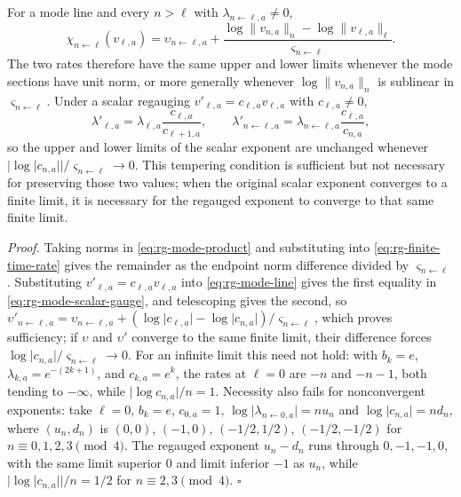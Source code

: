 For a mode line and every \(n>\ell\) with \(\lambda_{n\leftarrow\ell,a}\neq0\),
\begin{equation}
\chi_{n\leftarrow\ell}(v_{\ell,a})
=\upsilon_{n\leftarrow\ell,a}
+\frac{\log\lVert v_{n,a}\rVert_n-\log\lVert v_{\ell,a}\rVert_\ell}
{\varsigma_{n\leftarrow\ell}}.
\label{eq:rg-mode-exponent-relation}
\end{equation}
The two rates therefore have the same upper and lower limits whenever the mode
sections have unit norm, or more generally whenever
\(\log\lVert v_{n,a}\rVert_n\) is sublinear in \(\varsigma_{n\leftarrow\ell}\).
Under a scalar regauging \(v'_{\ell,a}=c_{\ell,a}v_{\ell,a}\) with
\(c_{\ell,a}\neq0\),
\begin{equation}
\lambda'_{\ell,a}=\lambda_{\ell,a}\frac{c_{\ell,a}}{c_{\ell+1,a}},
\qquad
\lambda'_{n\leftarrow\ell,a}
=\lambda_{n\leftarrow\ell,a}\frac{c_{\ell,a}}{c_{n,a}},
\label{eq:rg-mode-scalar-gauge}
\end{equation}
so the upper and lower limits of the scalar exponent are unchanged whenever
\(\lvert\log\lvert c_{n,a}\rvert\rvert/\varsigma_{n\leftarrow\ell}\to0\). This
tempering condition is sufficient but not necessary for preserving those two
values; when the original scalar exponent converges to a finite limit, it is necessary
for the regauged exponent to converge to that same finite limit. 

\noindent\emph{Proof.}
Taking norms in \eqref{eq:rg-mode-product} and substituting into
\eqref{eq:rg-finite-time-rate} gives the remainder as the endpoint norm
difference divided by \(\varsigma_{n\leftarrow\ell}\). Substituting
\(v'_{\ell,a}=c_{\ell,a}v_{\ell,a}\) into \eqref{eq:rg-mode-line} gives the
first equality in \eqref{eq:rg-mode-scalar-gauge}, and telescoping gives the
second, so
\(\upsilon'_{n\leftarrow\ell,a}=\upsilon_{n\leftarrow\ell,a}
+(\log\lvert c_{\ell,a}\rvert-\log\lvert c_{n,a}\rvert)/\varsigma_{n\leftarrow\ell}\),
which proves sufficiency; if \(\upsilon\) and \(\upsilon'\) converge to the
same finite limit, their difference forces
\(\log\lvert c_{n,a}\rvert/\varsigma_{n\leftarrow\ell}\to0\). For an infinite limit
this need not hold: with \(b_k=e\), \(\lambda_{k,a}=e^{-(2k+1)}\), and
\(c_{k,a}=e^k\), the rates at \(\ell=0\) are \(-n\) and \(-n-1\), both tending
to \(-\infty\), while \(\lvert\log c_{n,a}\rvert/n=1\). Necessity also fails
for nonconvergent exponents: take \(\ell=0\), \(b_k=e\), \(c_{0,a}=1\),
\(\log\lvert\lambda_{n\leftarrow0,a}\rvert=nu_n\) and
\(\log\lvert c_{n,a}\rvert=nd_n\), where \((u_n,d_n)\) is \((0,0)\),
\((-1,0)\), \((-1/2,1/2)\), \((-1/2,-1/2)\) for \(n\equiv0,1,2,3\pmod4\). The
regauged exponent \(u_n-d_n\) runs through \(0,-1,-1,0\), with the same limit
superior \(0\) and limit inferior \(-1\) as \(u_n\), while
\(\lvert\log\lvert c_{n,a}\rvert\rvert/n=1/2\) for \(n\equiv2,3\pmod4\).
\(\square\)

